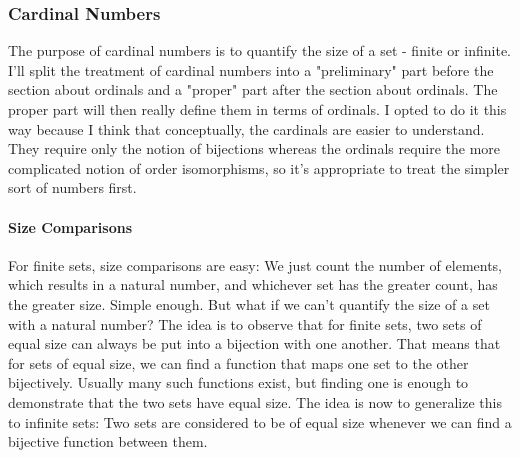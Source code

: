 





\subsubsection{Cardinal Numbers}
The purpose of cardinal numbers is to quantify the size of a set - finite or infinite. I'll split the treatment of cardinal numbers into a "preliminary" part before the section about ordinals and a "proper" part after the section about ordinals. The proper part will then really define them in terms of ordinals. I opted to do it this way because I think that conceptually, the cardinals are easier to understand. They require only the notion of bijections whereas the ordinals require the more complicated notion of order isomorphisms, so it's appropriate to treat the simpler sort of numbers first. 


\paragraph{Size Comparisons}
For finite sets, size comparisons are easy: We just count the number of elements, which results in a natural number, and whichever set has the greater count, has the greater size. Simple enough. But what if we can't quantify the size of a set with a natural number? The idea is to observe that for finite sets, two sets of equal size can always be put into a bijection with one another. That means that for sets of equal size, we can find a function that maps one set to the other bijectively. Usually many such functions exist, but finding one is enough to demonstrate that the two sets have equal size. The idea is now to generalize this to infinite sets: Two sets are considered to be of equal size whenever we can find a bijective function between them.

